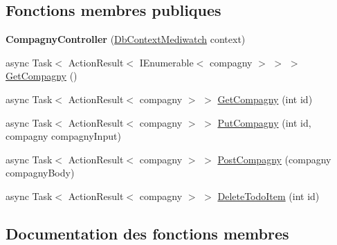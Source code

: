 \subsection*{Fonctions membres publiques}
\begin{DoxyCompactItemize}
\item 
\mbox{\label{class_mediwatch_1_1_server_1_1_controllers_1_1_compagny_controller_ab4a8837fdb737884b3248ee77f734ad0}} 
{\bfseries Compagny\+Controller} (\hyperlink{class_server_1_1_db_context_mediwatch}{Db\+Context\+Mediwatch} context)
\item 
async Task$<$ Action\+Result$<$ I\+Enumerable$<$ compagny $>$ $>$ $>$ \hyperlink{class_mediwatch_1_1_server_1_1_controllers_1_1_compagny_controller_a7bc69ceda49f9017a2d6ddfdbffe4758}{Get\+Compagny} ()
\item 
async Task$<$ Action\+Result$<$ compagny $>$ $>$ \hyperlink{class_mediwatch_1_1_server_1_1_controllers_1_1_compagny_controller_a6608c7128f9e7b31b04885ef1d7e004d}{Get\+Compagny} (int id)
\item 
async Task$<$ Action\+Result$<$ compagny $>$ $>$ \hyperlink{class_mediwatch_1_1_server_1_1_controllers_1_1_compagny_controller_a6d092dd8d9edcd60e4a38e1d90af3e40}{Put\+Compagny} (int id, compagny compagny\+Input)
\item 
async Task$<$ Action\+Result$<$ compagny $>$ $>$ \hyperlink{class_mediwatch_1_1_server_1_1_controllers_1_1_compagny_controller_ad144f627b336f3e43ba994fbdd9c9419}{Post\+Compagny} (compagny compagny\+Body)
\item 
async Task$<$ Action\+Result$<$ compagny $>$ $>$ \hyperlink{class_mediwatch_1_1_server_1_1_controllers_1_1_compagny_controller_a5c33b6687ecca9c5b060f029ce809e7d}{Delete\+Todo\+Item} (int id)
\end{DoxyCompactItemize}


\subsection{Documentation des fonctions membres}
\mbox{\label{class_mediwatch_1_1_server_1_1_controllers_1_1_compagny_controller_a5c33b6687ecca9c5b060f029ce809e7d}} 
